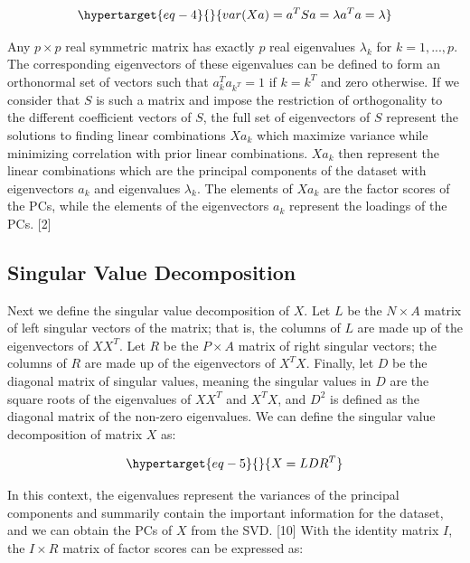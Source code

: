 \documentclass[
  letterpaper,
  DIV=11,
  numbers=noendperiod]{scrreprt}
\begin{document}
\begin{equation}\protect\hypertarget{eq-4}{}{
var(Xa) = a^TSa = \lambda a^Ta = \lambda
}\label{eq-4}\end{equation}

Any \(p \times p\) real symmetric matrix has exactly \(p\) real
eigenvalues \(\lambda_k\) for \(k = 1,...,p\). The corresponding
eigenvectors of these eigenvalues can be defined to form an orthonormal
set of vectors such that \(a_k^Ta_{k^T} = 1\) if \(k = k^T\) and zero
otherwise. If we consider that \(S\) is such a matrix and impose the
restriction of orthogonality to the different coefficient vectors of
\(S\), the full set of eigenvectors of \(S\) represent the solutions to
finding linear combinations \(Xa_k\) which maximize variance while
minimizing correlation with prior linear combinations. \(Xa_k\) then
represent the linear combinations which are the principal components of
the dataset with eigenvectors \(a_k\) and eigenvalues \(\lambda_k\). The
elements of \(Xa_k\) are the factor scores of the PCs, while the
elements of the eigenvectors \(a_k\) represent the loadings of the PCs.
{[}2{]}

\hypertarget{singular-value-decomposition}{%
\subsection{Singular Value
Decomposition}\label{singular-value-decomposition}}

Next we define the singular value decomposition of \(X\). Let \(L\) be
the \(N \times A\) matrix of left singular vectors of the matrix; that
is, the columns of \(L\) are made up of the eigenvectors of \(XX^T\).
Let \(R\) be the \(P \times A\) matrix of right singular vectors; the
columns of \(R\) are made up of the eigenvectors of \(X^TX\). Finally,
let \(D\) be the diagonal matrix of singular values, meaning the
singular values in \(D\) are the square roots of the eigenvalues of
\(XX^T\) and \(X^TX\), and \(D^2\) is defined as the diagonal matrix of
the non-zero eigenvalues. We can define the singular value decomposition
of matrix \(X\) as:

\begin{equation}\protect\hypertarget{eq-5}{}{
X = LD{R}^T
}\label{eq-5}\end{equation}

In this context, the eigenvalues represent the variances of the
principal components and summarily contain the important information for
the dataset, and we can obtain the PCs of \(X\) from the SVD. {[}10{]}
With the identity matrix \(I\), the \(I \times R\) matrix of factor
scores can be expressed as:
\end{document}
